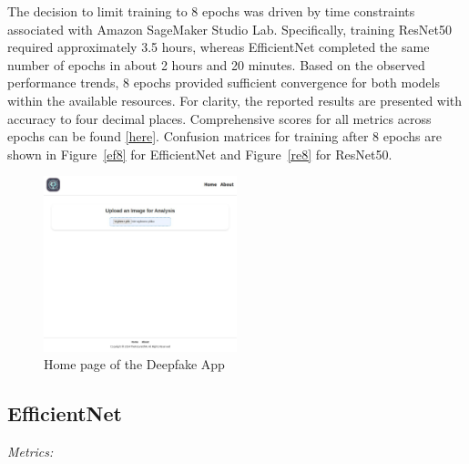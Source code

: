\documentclass[conference]{IEEEtran}
\begin{document}
The decision to limit training to 8 epochs was driven by time constraints associated with Amazon SageMaker Studio Lab. Specifically, training ResNet50 required approximately 3.5 hours, whereas EfficientNet completed the same number of epochs in about 2 hours and 20 minutes. Based on the observed performance trends, 8 epochs provided sufficient convergence for both models within the available resources. For clarity, the reported results are presented with accuracy to four decimal places. Comprehensive scores for all metrics across epochs can be found \href{https://github.com/konradwojda/HYU-AI-G08/tree/main/results}{[here]}. Confusion matrices for  training after 8 epochs are shown in Figure~\ref{ef8} for EfficientNet and Figure~\ref{re8} for ResNet50. 

\begin{figure}[ht]
\centering
\includegraphics[width=0.5\textwidth]{basic.jpg}
\caption{Home page of the Deepfake App}
\label{basic}
\end{figure} 

\subsection*{EfficientNet}
\textit{Metrics:}  

\begin{center}
\end{center}
\end{document}
